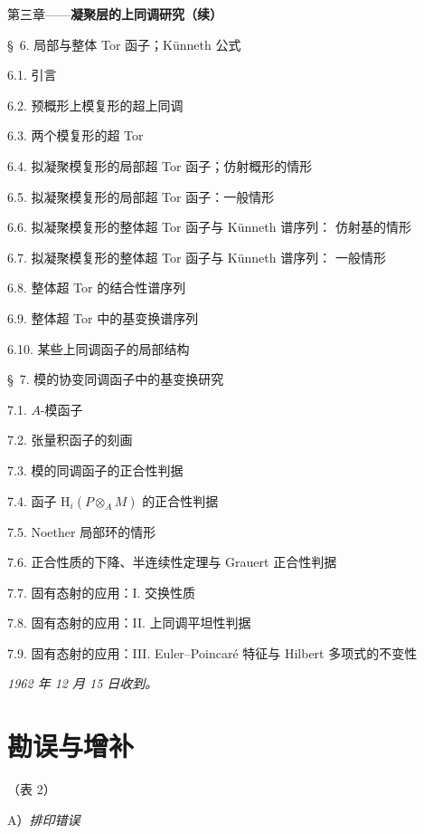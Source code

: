 \documentclass[UTF8,fontset=none,11pt,oneside,openany]{ctexbook}
\newcommand{\oldpage}[2][]{%
  \hypertarget{ega-source-page-#1-#2}{}%
  \marginnote{\scriptsize\textbf{#1}~|~#2}\ignorespaces}
\begin{document}
\begin{flushleft}
\textsc{第三章}——\textbf{凝聚层的上同调研究（续）} 

\medskip
\S~6. 局部与整体 Tor 函子；Künneth 公式 

6.1. 引言 

6.2. 预概形上模复形的超上同调 

6.3. 两个模复形的超 Tor 

6.4. 拟凝聚模复形的局部超 Tor 函子；仿射概形的情形 

6.5. 拟凝聚模复形的局部超 Tor 函子：一般情形 

6.6. 拟凝聚模复形的整体超 Tor 函子与 Künneth 谱序列：
仿射基的情形 

6.7. 拟凝聚模复形的整体超 Tor 函子与 Künneth 谱序列：
一般情形 

6.8. 整体超 Tor 的结合性谱序列 

6.9. 整体超 Tor 中的基变换谱序列 

6.10. 某些上同调函子的局部结构 

\medskip
\S~7. 模的协变同调函子中的基变换研究 

7.1. $A$-模函子 

7.2. 张量积函子的刻画 

7.3. 模的同调函子的正合性判据 

7.4. 函子 $\mathrm H_i(P\otimes_A M)$ 的正合性判据 

7.5. Noether 局部环的情形 

7.6. 正合性质的下降、半连续性定理与 Grauert 正合性判据 

7.7. 固有态射的应用：I. 交换性质 

7.8. 固有态射的应用：II. 上同调平坦性判据 

7.9. 固有态射的应用：III. Euler--Poincaré 特征与 Hilbert
多项式的不变性 

\begin{flushright}
\emph{1962 年 12 月 15 日收到。}
\end{flushright}
\end{flushleft}

\clearpage
\thispagestyle{empty}
\null
\clearpage

\oldpage[III]{217}
\section*{勘误与增补}
\begin{center}
（表 2）

\medskip
A）\emph{排印错误}
\end{center}
\end{document}

